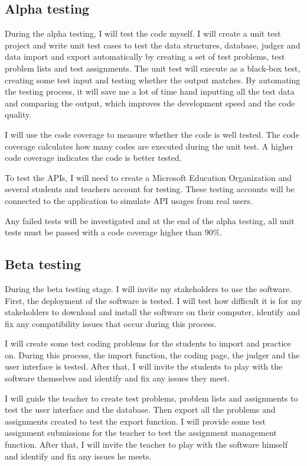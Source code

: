 \documentclass[a4paper]{report}
\begin{document}
\subsection{Alpha testing}

During the alpha testing, I will test the code myself. I will create a unit test project and write unit test cases to test the data structures, database, judger and data import and export automatically by creating a set of test problems, test problem lists and test assignments. The unit test will execute as a black-box test, creating some test input and testing whether the output matches. By automating the testing process, it will save me a lot of time hand inputting all the test data and comparing the output, which improves the development speed and the code quality.

I will use the code coverage to measure whether the code is well tested. The code coverage calculates how many codes are executed during the unit test. A higher code coverage indicates the code is better tested.

To test the APIs, I will need to create a Microsoft Education Organization and several students and teachers account for testing. These testing accounts will be connected to the application to 
simulate API usages from real users.

Any failed tests will be investigated and at the end of the alpha testing, all unit tests must be passed with a code coverage higher than 90\%.

\subsection{Beta testing}

During the beta testing stage. I will invite my stakeholders to use the software. First, the deployment of the software is tested. I will test how difficult it is for my stakeholders to download and install the software on their computer, identify and fix any compatibility issues that occur during this process.

I will create some test coding problems for the students to import and practice on. During this process, the import function, the coding page, the judger and the user interface is tested. After that, I will invite the students to play with the software themselves and identify and fix any issues they meet.

I will guide the teacher to create test problems, problem lists and assignments to test the user interface and the database. Then export all the problems and assignments created to test the export function. I will provide some test assignment submissions for the teacher to test the assignment management function. After that, I will invite the teacher to play with the software himself and identify and fix any issues he meets.
\end{document}
